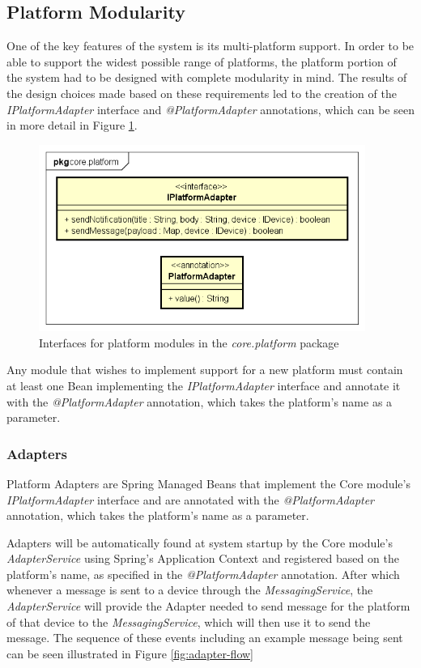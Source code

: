 \subsection{Platform Modularity}
One of the key features of the system is its multi-platform support. In order to be able to support the widest possible range of platforms, the platform portion of the system had to be designed with complete modularity in mind. The results of the design choices made based on these requirements led to the creation of the \textit{IPlatformAdapter} interface and \textit{@PlatformAdapter} annotations, which can be seen in more detail in Figure \ref{fig:core-platform-module}.

\begin{figure}[!htb]
	\centering
	\includegraphics[width=0.95\textwidth]{figures/03_design/core-platform-module}
    \caption{Interfaces for platform modules in the \textit{core.platform} package}
    \label{fig:core-platform-module}
\end{figure}

Any module that wishes to implement support for a new platform must contain at least one Bean implementing the \textit{IPlatformAdapter} interface and annotate it with the \textit{@PlatformAdapter} annotation, which takes the platform's name as a parameter.

\subsubsection{Adapters}\label{sec:adapters}
Platform Adapters are Spring Managed Beans that implement the Core module's \textit{IPlatformAdapter} interface and are annotated with the \textit{@PlatformAdapter} annotation, which takes the platform's name as a parameter. 

Adapters will be automatically found at system startup by the Core module's \textit{AdapterService} using Spring's Application Context and registered based on the platform's name, as specified in the \textit{@PlatformAdapter} annotation. After which whenever a message is sent to a device through the \textit{MessagingService}, the \textit{AdapterService} will provide the Adapter needed to send message for the platform of that device to the \textit{MessagingService}, which will then use it to send the message. The sequence of these events including an example message being sent can be seen illustrated in Figure \ref{fig:adapter-flow}

